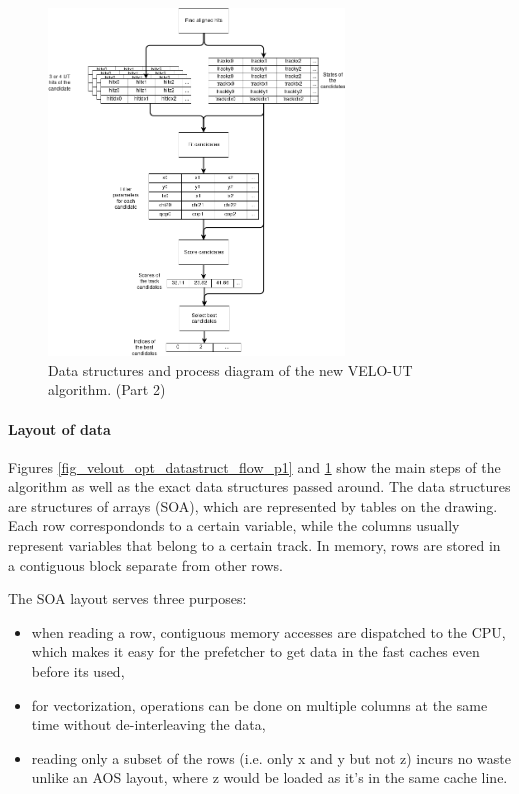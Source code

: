 \documentclass[12pt]{article}
\begin{document}
\begin{figure}[H]
	\begin{center}
		\includegraphics[width=0.7\textwidth]{velout_opt_datastruct_flow_p2}
	\end{center}
	\caption{Data structures and process diagram of the new VELO-UT algorithm. (Part 2)}
	\label{fig_velout_opt_datastruct_flow_p2}
\end{figure}

\paragraph{Layout of data} \mbox{}\vspace{0.4pc}

Figures \ref{fig_velout_opt_datastruct_flow_p1} and \ref{fig_velout_opt_datastruct_flow_p2} show the main steps of the algorithm as well as the exact data structures passed around. The data structures are structures of arrays (SOA), which are represented by tables on the drawing. Each row correspondonds to a certain variable, while the columns usually represent variables that belong to a certain track. In memory, rows are stored in a contiguous block separate from other rows.

The SOA layout serves three purposes:
\begin{itemize}
	\item when reading a row, contiguous memory accesses are dispatched to the CPU, which makes it easy for the prefetcher to get data in the fast caches even before its used,
	\item for vectorization, operations can be done on multiple columns at the same time without de-interleaving the data,
	\item reading only a subset of the rows (i.e. only x and y but not z) incurs no waste unlike an AOS layout, where z would be loaded as it's in the same cache line.
\end{itemize}
\end{document}
